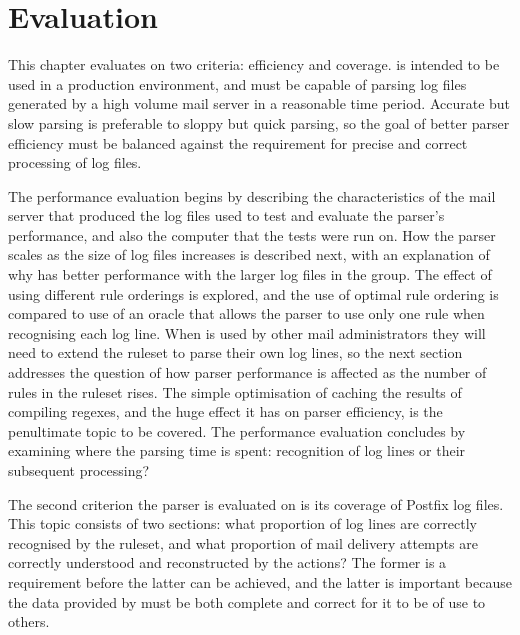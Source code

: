 \chapter{Evaluation}

\label{Evaluation}

\renewcommand{\figurename}{Graph}

\addtolength{\tabcolsep}{-2pt}

This chapter evaluates \parsername{} on two criteria: efficiency and
coverage.  \parsername{} is intended to be used in a production
environment, and must be capable of parsing log files generated by a high
volume mail server in a reasonable time period.  Accurate but slow parsing
is preferable to sloppy but quick parsing, so the goal of better parser
efficiency must be balanced against the requirement for precise and correct
processing of log files.

The performance evaluation begins by describing the characteristics of the
mail server that produced the log files used to test and evaluate the
parser's performance, and also the computer that the tests were run on.
How the parser scales as the size of log files increases is described next,
with an explanation of why \parsername{} has better performance with the
larger log files in the group.  The effect of using different rule
orderings is explored, and the use of optimal rule ordering is compared to
use of an oracle that allows the parser to use only one rule when
recognising each log line.  When \parsername{} is used by other mail
administrators they will need to extend the ruleset to parse their own log
lines, so the next section addresses the question of how parser performance
is affected as the number of rules in the ruleset rises.  The simple
optimisation of caching the results of compiling regexes, and the huge
effect it has on parser efficiency, is the penultimate topic to be covered.
The performance evaluation concludes by examining where the parsing time is
spent: recognition of log lines or their subsequent processing?

The second criterion the parser is evaluated on is its coverage of Postfix
log files.  This topic consists of two sections: what proportion of log
lines are correctly recognised by the ruleset, and what proportion of mail
delivery attempts are correctly understood and reconstructed by the
actions?  The former is a requirement before the latter can be achieved,
and the latter is important because the data provided by \parsername{} must
be both complete and correct for it to be of use to others.

